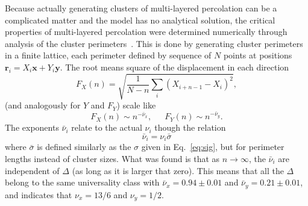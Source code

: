 Because actually generating clusters of multi-layered percolation can be a
complicated matter and the model has no analytical solution, the critical
properties of multi-layered percolation were determined numerically through
analysis of the cluster perimeters~\cite{Dayan1991, Samyr2009, Parteli2010}.
This is done by generating cluster perimeters in a finite lattice, each
perimeter defined by sequence of $N$ points at positions
$\mathbf{r}_i=X_i\mathbf{x}+Y_i\mathbf{y}$. The root means square of the
displacement in each direction
\begin{equation}
    F_{X}\left(n\right)=
    \sqrt{\frac{1}{N-n}\sum_{i}{\left(X_{i+n-1}-X_{i}\right)}^{2}},
\end{equation}
(and analogously for $Y$ and $F_Y$) scale like
\begin{equation}
    F_{X}\left(n\right)\sim n^{-\bar{\nu}_{x}},
    \,\,\,\,\,\,\,\,\,
    F_{Y}\left(n\right)\sim n^{-\bar{\nu}_{y}}.
\end{equation}
The exponents $\bar{\nu}_i$ relate to the actual $\nu_i$ though the relation
\begin{equation}
    \bar{\nu}_i = \nu_i \bar{\sigma}
\end{equation}
where $\bar{\sigma}$ is defined similarly as the $\sigma$ given in
Eq.~\ref{eq:sig}, but for perimeter lengths instead of cluster sizes.
What was found is that as $n\rightarrow\infty$, the $\bar{\nu}_i$ are
independent of $\Delta$ (as long as it is larger that zero).
This means that all the $\Delta$ belong to the same universality class
with $\bar{\nu}_x=0.94\pm0.01$ and $\bar{\nu}_y=0.21\pm0.01$, and
indicates that $\nu_x=13/6$ and $\nu_y=1/2$.


